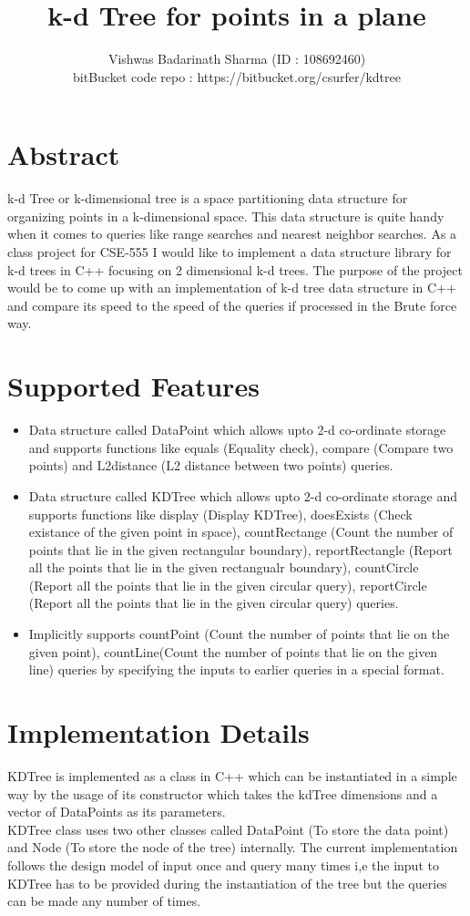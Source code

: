 \documentclass[11pt]{article}
\title{\textbf{k-d Tree for points in a plane}}
\author{Vishwas Badarinath Sharma 
		(ID : 108692460)\\
		bitBucket code repo : https://bitbucket.org/csurfer/kdtree}
\date{}
\begin{document}
\maketitle

\section{Abstract}

k-d Tree or k-dimensional tree is a space partitioning data structure for
organizing points in a k-dimensional space. This data structure is quite handy
when it comes to queries like range searches and nearest neighbor searches. As a class project for CSE-555 I would like to implement a data structure library for k-d trees in C++ focusing on 2 dimensional k-d trees. The purpose of the project would be to come up with an implementation of k-d tree data structure in C++ and compare its speed to the speed of the queries if processed in the Brute force way.

\section{Supported Features}

\begin{itemize}
  \item Data structure called DataPoint which allows upto 2-d co-ordinate storage and supports functions like equals (Equality check), compare (Compare two points) and L2distance (L2 distance between two points) queries. 
  \item Data structure called KDTree which allows upto 2-d co-ordinate storage and supports functions like display (Display KDTree), doesExists (Check existance of the given point in space), countRectange (Count the number of points that lie in the given rectangular boundary), reportRectangle (Report all the points that lie in the given rectangualr boundary), countCircle (Report all the points that lie in the given circular query), reportCircle (Report all the points that lie in the given circular query) queries.
  \item Implicitly supports countPoint (Count the number of points that lie on the given point), countLine(Count the number of points that lie on the given line) queries by specifying the inputs to earlier queries in a special format.
\end{itemize}

\section{Implementation Details}
\indent KDTree is implemented as a class in C++ which can be instantiated in a simple way by the usage of its constructor which takes the kdTree dimensions and a vector of DataPoints as its parameters.\\
\indent KDTree class uses two other classes called DataPoint (To store the data point) and Node (To store the node of the tree) internally. The current implementation follows the design model of input once and query many times i,e the input to KDTree has to be provided during the instantiation of the tree but the queries can be made any number of times.
\end{document}

